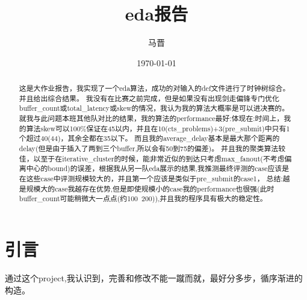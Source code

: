\documentclass[12pt]{ctexart}
\title{eda报告}
\author{马晋}
\date{\today}
\begin{document}
\maketitle

\begin{abstract}
    这是大作业报告，我实现了一个eda算法，成功的对输入的def文件进行了时钟树综合。并且给出综合结果。
    我没有在比赛之前完成，但是如果没有出现剑走偏锋专门优化buffer\_count或total\_latency或skew的情况，我认为我的算法大概率是可以进决赛的。
    就我与此问题本班其他队对比的结果，我的算法的performance最好:体现在:时间上，我的算法skew可以100\%保证在45以内，并且在10(cts\_problems)+3(pre\_submit)中只有1个超过40(44)，其余全都在35以下。
    而且我的average\_delay基本是最大那个距离的delay(但是由于插入了两到三个buffer,所以会有50到75的偏差)。
    并且我的聚类算法较佳，以至于在iterative\_cluster的时候，能非常近似的到达只考虑max\_fanout(不考虑偏离中心的bound)的误差，根据我从另一队eda展示的结果,我推测最终评测的case应该是在这些case中评测规模较大的，并且第一个应该是类似于pre\_submit的case1，
    总结:越是规模大的case我越存在优势,但是即使规模小的case我的performance也很强(此时buffer\_count可能稍微大一点点(约100~200)),并且我的程序具有极大的稳定性。
\end{abstract}

\tableofcontents
\newpage

\section{引言}
通过这个project,我认识到，完善和修改不能一蹴而就，最好分多步，循序渐进的构造。
\end{document}
